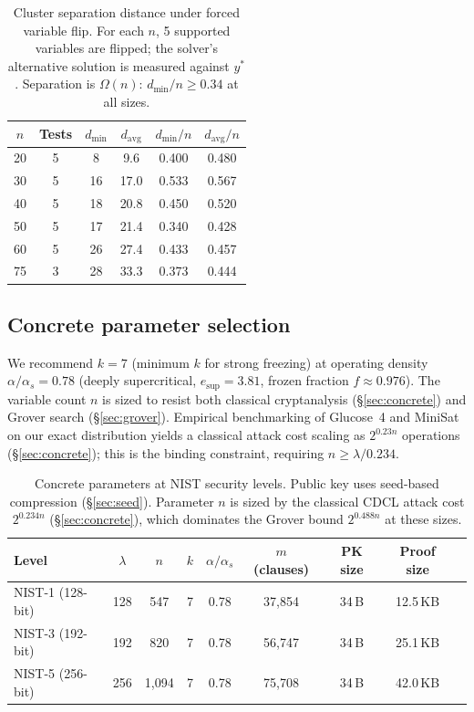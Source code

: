 \documentclass[11pt]{article}
\begin{document}
\begin{table}[ht]
\centering
\caption{Cluster separation distance under forced variable flip.  For each $n$, 5 supported variables are flipped; the solver's alternative solution is measured against $y^*$.  Separation is $\Omega(n)$: $d_{\min}/n \geq 0.34$ at all sizes.}\label{tab:separation}
\begin{tabular}{@{}cccccc@{}}
\toprule
$n$ & Tests & $d_{\min}$ & $d_{\mathrm{avg}}$ & $d_{\min}/n$ & $d_{\mathrm{avg}}/n$ \\
\midrule
20 & 5 & 8  & 9.6  & 0.400 & 0.480 \\
30 & 5 & 16 & 17.0 & 0.533 & 0.567 \\
40 & 5 & 18 & 20.8 & 0.450 & 0.520 \\
50 & 5 & 17 & 21.4 & 0.340 & 0.428 \\
60 & 5 & 26 & 27.4 & 0.433 & 0.457 \\
75 & 3 & 28 & 33.3 & 0.373 & 0.444 \\
\bottomrule
\end{tabular}
\end{table}


\subsection{Concrete parameter selection}\label{sec:params}

We recommend $k = 7$ (minimum $k$ for strong freezing) at operating density $\alpha/\alpha_s = 0.78$ (deeply supercritical, $e_{\mathrm{sup}} = 3.81$, frozen fraction $f \approx 0.976$).  The variable count $n$ is sized to resist both classical cryptanalysis (\S\ref{sec:concrete}) and Grover search (\S\ref{sec:grover}).  Empirical benchmarking of Glucose~4 and MiniSat on our exact distribution yields a classical attack cost scaling as $2^{0.23n}$ operations (\S\ref{sec:concrete}); this is the binding constraint, requiring $n \geq \lambda / 0.234$.

\begin{table}[ht]
\centering
\caption{Concrete parameters at NIST security levels.  Public key uses seed-based compression (\S\ref{sec:seed}).  Parameter $n$ is sized by the classical CDCL attack cost $2^{0.234n}$ (\S\ref{sec:concrete}), which dominates the Grover bound $2^{0.488n}$ at these sizes.}\label{tab:params}
\begin{tabular}{@{}lcccccccc@{}}
\toprule
Level & $\lambda$ & $n$ & $k$ & $\alpha/\alpha_s$ & $m$ (clauses) & PK size & Proof size \\
\midrule
NIST-1 (128-bit) & 128 & 547 & 7 & 0.78 & 37{,}854 & 34\,B & 12.5\,KB \\
NIST-3 (192-bit) & 192 & 820 & 7 & 0.78 & 56{,}747 & 34\,B & 25.1\,KB \\
NIST-5 (256-bit) & 256 & 1{,}094 & 7 & 0.78 & 75{,}708 & 34\,B & 42.0\,KB \\
\bottomrule
\end{tabular}
\end{table}
\end{document}
